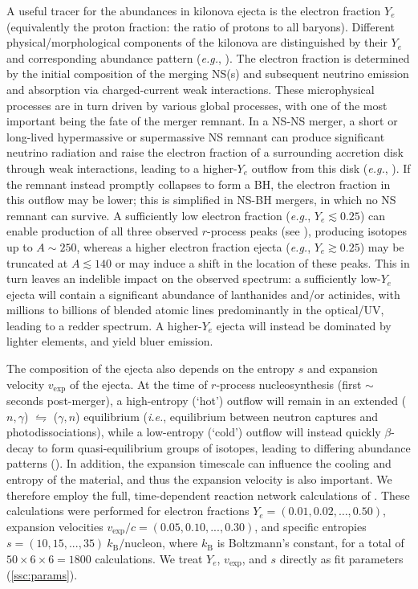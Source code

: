 \documentclass[twocolumn, twocolappendix]{aastex63}
\def\eg{{\it e.g.}}
\def\ie{{\it i.e.}}
\begin{document}
A useful tracer for the abundances in kilonova ejecta is the electron fraction $Y_e$ (equivalently the proton fraction: the ratio of protons to all baryons). Different physical/morphological components of the kilonova are distinguished by their $Y_e$ and corresponding abundance pattern (\eg, \citealt{wanajo14, just15, mendoza-temis15, wu16}). The electron fraction is determined by the initial composition of the merging
NS(s) and subsequent neutrino emission and absorption via charged-current weak interactions. These microphysical processes are in turn driven by various global processes, with one of the most important being the fate of the merger remnant. In a NS-NS merger, a short or long-lived hypermassive or supermassive NS remnant can produce significant neutrino radiation and raise the electron fraction of a surrounding accretion disk through weak interactions, leading to a higher-$Y_e$ outflow from this disk (\eg, \citealt{metzger14, perego14, lippuner17, siegel18, fahlman18, miller19, nedora21}). If the remnant instead promptly collapses to form a BH, the electron fraction in this outflow may be lower; this is simplified in NS-BH mergers, in which no NS remnant can survive. A sufficiently low electron fraction (\eg, $Y_e \lesssim 0.25$) can enable production of all three observed $r$-process peaks (see \citealt{cowan21}), producing isotopes up to $A \sim 250$, whereas a higher electron fraction ejecta (\eg, $Y_e \gtrsim 0.25$) may be truncated at $A \lesssim 140$ or may induce a shift in the location of these peaks. This in turn leaves an indelible impact on the observed spectrum: a sufficiently low-$Y_e$ ejecta will contain a significant abundance of lanthanides and/or actinides, with millions to billions of blended atomic lines predominantly in the optical/UV, leading to a redder spectrum. A higher-$Y_e$ ejecta will instead be dominated by lighter elements, and yield bluer emission.


The composition of the ejecta also depends on the entropy $s$ and expansion velocity $v_{\mathrm{exp}}$ of the ejecta. At the time of $r$-process nucleosynthesis (first $\sim$ seconds post-merger), a high-entropy (`hot') outflow will remain in an extended ($n, \gamma$) $\leftrightharpoons$ ($\gamma, n$) equilibrium (\ie, equilibrium between neutron captures and photodissociations), while a low-entropy (`cold') outflow will instead quickly $\beta$-decay to form quasi-equilibrium groups of isotopes, leading to differing abundance patterns (\citealt{cowan21, vassh21}). In addition, the expansion timescale can influence the cooling and entropy of the material, and thus the expansion velocity is also important. We therefore employ the full, time-dependent reaction network calculations of \cite{wanajo18}. These calculations were performed for electron fractions $Y_e = (0.01, 0.02, \ldots, 0.50)$, expansion velocities $v_{\mathrm{exp}}/c = (0.05, 0.10, ..., 0.30)$, and specific entropies $s = (10, 15, ..., 35)~k_{\mathrm{B}}/\mathrm{nucleon}$, where $k_{\mathrm{B}}$ is Boltzmann's constant, for a total of $50 \times 6 \times 6 = 1800$ calculations. We treat $Y_e$, $v_{\mathrm{exp}}$, and $s$ directly as fit parameters (\ref{ssc:params}).
\end{document}
